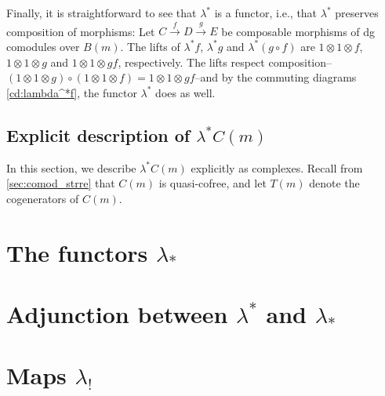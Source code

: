 Finally, it is straightforward to see that $\lambda^*$ 
is a functor, i.e., that $\lambda^*$ preserves composition
of morphisms: Let $C \overset{f}{\to} D \overset{g}{\to} E$ be 
composable morphisms of dg comodules over $B(m)$. The lifts of
$\lambda^*f$, $\lambda^*g$ and $\lambda^*(g\circ f)$ are 
$1\otimes 1\otimes f$, $1\otimes 1\otimes g$ and 
$1\otimes 1\otimes gf$, respectively. The lifts 
respect composition--$(1\otimes 1\otimes g) \circ 
(1\otimes 1\otimes f) = 1\otimes 1\otimes gf$--and by 
the commuting diagrams \ref{cd:lambda^*f}, the 
functor $\lambda^*$ does as well.

\subsection{Explicit description of $\lambda^*C(m)$}
In this section, we describe $\lambda^*C(m)$ explicitly as 
complexes. Recall from \ref{sec:comod_strre} that $C(m)$ is 
quasi-cofree, and let $T(m)$ denote the cogenerators of 
$C(m)$.


\section{The functors $\lambda_*$}
\section{Adjunction between $\lambda^*$ and $\lambda_*$}
\section{Maps $\lambda_!$}